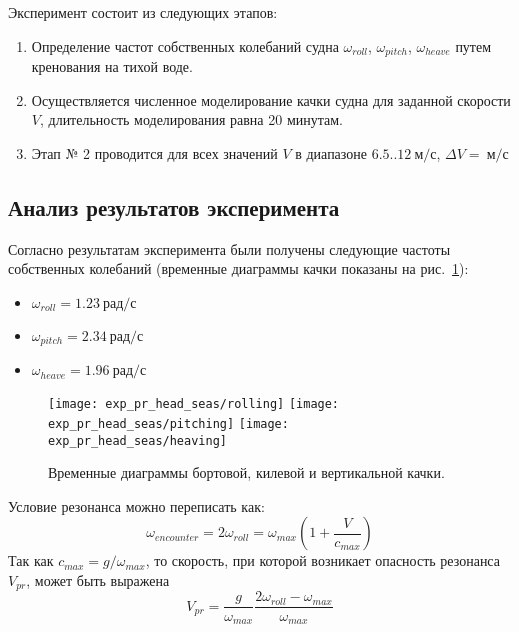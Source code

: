 Эксперимент состоит из следующих этапов:
\begin{enumerate}
	\item	Определение частот собственных колебаний судна 
			$\omega_{roll}$, $\omega_{pitch}$, $\omega_{heave}$ путем кренования на тихой воде.
	\item	Осуществляется численное моделирование качки судна для заданной скорости $V$, длительность моделирования равна 20 минутам.
	\item	Этап № 2	проводится для всех значений $V$ в диапазоне 
			$6.5..12\ \text{м/с}$, $\Delta V=\ \text{м/с}$ 
\end{enumerate}

\subsection{Анализ результатов эксперимента}

Согласно результатам эксперимента были получены следующие частоты собственных колебаний (временные диаграммы качки показаны на рис.~\ref{exp_pr2_rolling}):
\begin{itemize}
	\item	$ \omega_{roll} = 1.23 \ \text{рад/с}$
	\item	$ \omega_{pitch} = 2.34 \ \text{рад/с}$
	\item	$ \omega_{heave} = 1.96 \ \text{рад/с}$
\end{itemize}

\begin{figure}[ht]
	\begin{center}
	\texttt{[image: exp\_pr\_head\_seas/rolling]}
	\texttt{[image: exp\_pr\_head\_seas/pitching]}
	\texttt{[image: exp\_pr\_head\_seas/heaving]}
	\end{center}
	\caption{Временные диаграммы бортовой, килевой и вертикальной качки.}
	\label{exp_pr2_rolling}
\end{figure}

Условие резонанса можно переписать как:
\begin{equation}
	\omega_{encounter} = 2 \omega_{roll} = \omega_{max} \left(  1 + \frac{V}{c_{max}}  \right)
\end{equation}
Так как $c_{max} = g / \omega_{max}$, то скорость, при которой возникает опасность резонанса $V_{pr}$, может быть выражена
\begin{equation}
	V_{pr} = \frac{g}{\omega_{max}} \frac{ 2 \omega_{roll} - \omega_{max} }{ \omega_{max}}
\end{equation}

